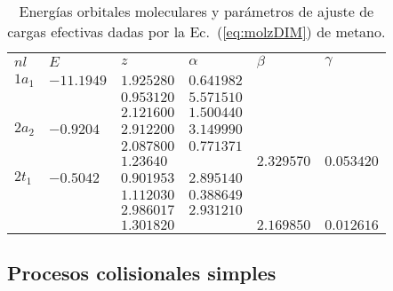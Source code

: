 \begin{table}[t]
\centering
\begin{tabular}{
>{\centering\arraybackslash}p{}
>{\centering\arraybackslash}p{}
>{\centering\arraybackslash}p{}
>{\centering\arraybackslash}p{}
>{\centering\arraybackslash}p{}
>{\centering\arraybackslash}p{}}
\rowcolor{mydarkgray} 
   $nl$ & $E$        & $z$        & $\alpha$   & $\beta$ & $\gamma$ \\
$1a_1$  & $-11.1949$ & $1.925280$ & $0.641982$ & & \\
\rowcolor{mygray} 
        &            & $0.953120$ & $5.571510$ & & \\
        &            & $2.121600$ & $1.500440$ & & \\
\rowcolor{mygray} 
$2a_2$  & $-0.9204$  & $2.912200$ & $3.149990$ & & \\
        &            & $2.087800$ & $0.771371$ & & \\
\rowcolor{mygray} 
        &            & $1.23640$  &            & $2.329570$ & $0.053420$ \\
$2t_1$  & $-0.5042$  & $0.901953$ & $2.895140$ & & \\
\rowcolor{mygray} 
        &            & $1.112030$ & $0.388649$ & & \\
        &            & $2.986017$ & $2.931210$ & & \\
\rowcolor{mygray} 
        &            & $1.301820$ &            & $2.169850$ & $0.012616$ \\ 
\end{tabular}
\caption[Energías y parámetros de ajuste de cargas efectivas de metano.]
{Energías orbitales moleculares y parámetros de ajuste de cargas efectivas dadas por la Ec.~(\ref{eq:molzDIM}) de metano.}
\label{tab:ch4parameters}
\end{table}

\subsection{Procesos colisionales simples}

